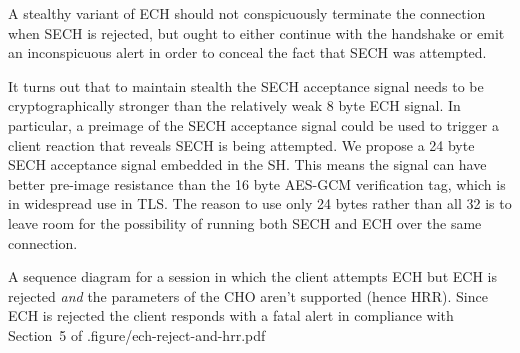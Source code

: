 A stealthy variant of \ac{ECH} should not conspicuously terminate the connection when \ac{SECH} is rejected,
but ought to either continue with the handshake or emit an inconspicuous alert in order to conceal the fact that \ac{SECH} was attempted.

It turns out that to maintain stealth the \ac{SECH} acceptance signal
needs to be cryptographically stronger than the
relatively weak 8 byte \ac{ECH} signal.
In particular, a preimage of the \ac{SECH} acceptance signal
could be used to trigger a client reaction that reveals \ac{SECH} is being attempted.
We propose a 24 byte \ac{SECH} acceptance signal embedded in the \ac{SH}.
This means the signal can have better pre-image resistance
than the 16 byte \ac{AES}-\ac{GCM} verification tag, 
which is in widespread use in \ac{TLS}.
The reason to use only 24 bytes rather than all 32 is to leave room for the possibility of running both \ac{SECH} and \ac{ECH} over the same connection.

    {
    A sequence diagram for a session in which the client attempts \ac{ECH} but \ac{ECH} is rejected {\em and} the parameters of the \ac{CHO} aren't supported (hence \ac{HRR}).
    Since \ac{ECH} is rejected the client responds with a fatal  alert in compliance with Section~5 of \cite{esni}.}{figure/ech-reject-and-hrr.pdf}

